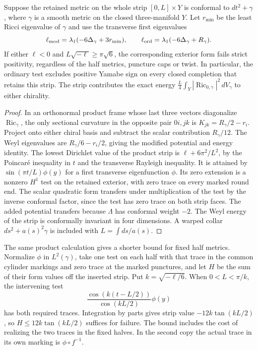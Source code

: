 \begin{proposition}
\label{prop:marked-double-neck}
Suppose the retained metric on the whole strip \([0,L]\times Y\)
is conformal to \(dt^2+\gamma\), where \(\gamma\) is a smooth
metric on the closed three-manifold \(Y\). Let \(r_{\min}\) be
the least Ricci eigenvalue of \(\gamma\) and use the transverse
first eigenvalues
\[
 \ell_{\rm mod}=\lambda_1(-6\Delta_\gamma+3r_{\min}),\qquad
 \ell_{\rm ord}=\lambda_1(-6\Delta_\gamma+R_\gamma).
\]
If either \(\ell<0\) and \(L\sqrt{-\ell}\ge\pi\sqrt6\), the
corresponding exterior form fails strict positivity, regardless
of the half metrics, puncture caps or twist. In particular, the
ordinary test excludes positive Yamabe sign on every closed
completion that retains this strip. The strip contributes the
exact energy \(\frac L4\int_Y|\operatorname{Ric}_{0,\gamma}|^2
\,dV_\gamma\) to either chirality.
\end{proposition}

\begin{proof}
In an orthonormal product frame whose last three vectors
diagonalize \(\operatorname{Ric}_\gamma\), the only sectional
curvature in the opposite pair \(0i,jk\) is
\(K_{jk}=R_\gamma/2-r_i\). Project onto either chiral basis and
subtract the scalar contribution \(R_\gamma/12\).
The Weyl eigenvalues are \(R_\gamma/6-r_i/2\), giving the
modified potential and energy identity. The lowest Dirichlet
value of the product strip is \(\ell+6\pi^2/L^2\), by the
Poincaré inequality in \(t\) and the transverse Rayleigh
inequality. It is attained by \(\sin(\pi t/L)\phi(y)\) for a
first transverse eigenfunction \(\phi\). Its zero extension
is a nonzero \(H^1\) test on the retained exterior, with zero
trace on every marked round end. The scalar quadratic form
transfers under multiplication of the test by the inverse
conformal factor, since the test has zero trace on both strip
faces. The added potential transfers because \(\Lambda\) has
conformal weight \(-2\). The Weyl energy of the strip is
conformally invariant in four dimensions. A warped collar
\(ds^2+a(s)^2\gamma\) is included with \(L=\int ds/a(s)\).
\end{proof}

The same product calculation gives a shorter bound for fixed
half metrics. Normalize \(\phi\) in \(L^2(\gamma)\), take one
test on each half with that trace in the common cylinder
markings and zero trace at the marked punctures, and let \(H\)
be the sum of their form values off the inserted strip. Put
\(k=\sqrt{-\ell/6}\). When \(0<L<\pi/k\), the intervening test
\[
 \frac{\cos(k(t-L/2))}{\cos(kL/2)}\phi(y)
\]
has both required traces. Integration by parts gives strip
value \(-12k\tan(kL/2)\), so \(H\le12k\tan(kL/2)\) suffices
for failure. The bound includes the cost of realizing the
two traces in the fixed halves. In the second copy the
actual trace in its own marking is \(\phi\circ f^{-1}\).

